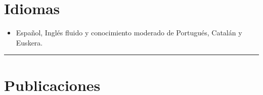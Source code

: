 \documentclass{article}
\begin{document}

\section*{Idiomas}
\begin{itemize}\itemsep 0pt
\item Espa\~nol, Ingl\'{e}s fluido y conocimiento moderado de Portugu\'es, 
Catal\'{a}n y Euskera.
\end{itemize}



\bigskip

\hrule

\newpage


\section*{Publicaciones}
\end{document}
